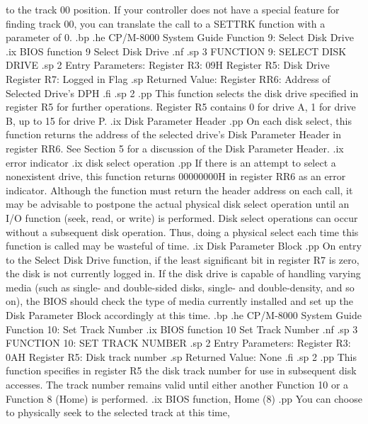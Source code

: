 to the track 00 position.  If your controller does not have a special
feature for finding track 00, you can translate the call to a SETTRK function
with a parameter of 0.
.bp
.he CP/M-8000 System Guide              Function 9:  Select Disk Drive
.ix BIOS function 9 Select Disk Drive
.nf
.sp 3  
                 FUNCTION 9:  SELECT DISK DRIVE
.sp 2 
              Entry Parameters:
                 Register R3: 09H
                 Register R5: Disk Drive
                 Register R7: Logged in Flag
.sp
              Returned   Value:
                 Register RR6: Address of Selected 
                                Drive's DPH
.fi
.sp 2
.pp
This function selects the disk drive specified in register R5 for
further operations.  Register R5 contains 0 for drive A, 1 for drive B,
up to 15 for drive P.  
.ix Disk Parameter Header
.pp
On each disk select, this function returns the address of the selected drive's
Disk Parameter Header in register RR6.  See Section 5 for a discussion of the
Disk Parameter Header.  
.ix error indicator
.ix disk select operation
.pp
If there is an attempt to select a nonexistent drive, this function
returns 00000000H
in register RR6 as an error indicator.  Although the function must return the
header address on each call, it may be advisable to postpone the actual
physical disk select operation until an I/O function (seek, read, or
write) is performed.  Disk select operations can occur without a
subsequent disk operation.  Thus, doing a physical select each time this 
function is called may be wasteful of time.
.ix Disk Parameter Block
.pp
On entry to the Select Disk Drive function,
if the least significant bit in register R7 is zero,
the disk is not currently logged in.  If the disk drive is capable of
handling varying media (such as single- and double-sided disks, single- and 
double-density, and so on), the BIOS should check the type of
media currently installed and set up the Disk Parameter Block
accordingly at this time.
.bp
.he CP/M-8000 System Guide              Function 10:  Set Track Number
.ix BIOS function 10 Set Track Number
.nf
.sp 3
                 FUNCTION 10:  SET TRACK NUMBER
.sp 2 
               Entry Parameters:
                  Register R3: 0AH
                  Register R5: Disk track number
.sp
               Returned   Value: None
.fi
.sp 2
.pp
This function specifies in register R5 the disk track number for
use in subsequent disk accesses.  The track number remains valid until
either another Function 10 or a Function 8 (Home) is performed.
.ix BIOS function, Home (8)
.pp
You can choose to physically seek to the selected track at this time,
